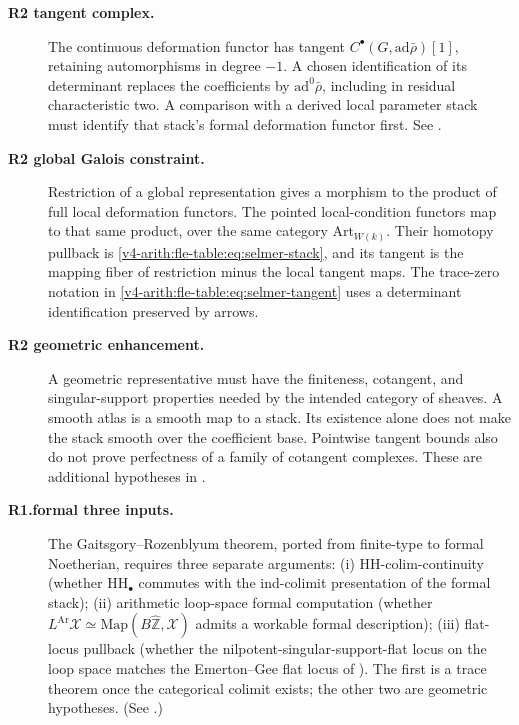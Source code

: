 \begin{description}
\item[\textbf{R2 tangent complex.}]
The continuous deformation functor has tangent
\(C^\bullet(G,\mathrm{ad}\bar\rho)[1]\), retaining automorphisms
in degree \(-1\). A chosen identification of its determinant replaces
the coefficients by \(\mathrm{ad}^0\bar\rho\), including in residual
characteristic two. A comparison with a derived local parameter stack
must identify that stack's formal deformation functor first. See
.

\item[\textbf{R2 global Galois constraint.}]
Restriction of a global representation gives a morphism to the product
of full local deformation functors. The pointed local-condition
functors map to that same product, over the same category
\(\mathrm{Art}_{W(k)}\). Their homotopy pullback is
\eqref{v4-arith:fle-table:eq:selmer-stack}, and its tangent is the
mapping fiber of restriction minus the local tangent maps.
The trace-zero notation in
\eqref{v4-arith:fle-table:eq:selmer-tangent} uses a determinant
identification preserved by arrows.

\item[\textbf{R2 geometric enhancement.}]
A geometric representative must have the finiteness, cotangent, and
singular-support properties needed by the intended category of sheaves.
A smooth atlas is a smooth map to a stack. Its existence alone does
not make the stack smooth over the coefficient base. Pointwise tangent
bounds also do not prove perfectness of a family of cotangent complexes.
These are additional hypotheses in
.

\item[\textbf{R1.formal three inputs.}]
The Gaitsgory--Rozenblyum theorem, ported from finite-type to formal
Noetherian, requires three separate arguments: (i) HH-colim-continuity
(whether \(\mathrm{HH}_{\bullet}\) commutes with the ind-colimit
presentation of the formal stack); (ii) arithmetic loop-space formal
computation (whether \(L^{\mathrm{Ar}}\mathcal{X}
\simeq\mathrm{Map}(B\widehat{\mathbb{Z}},\mathcal{X})\) admits a workable
formal description); (iii) flat-locus pullback (whether the
nilpotent-singular-support-flat locus on the loop space matches
the Emerton--Gee flat locus of ).
The first is a trace theorem once the categorical colimit exists; the
other two are geometric hypotheses.
(See .)


\end{description}

